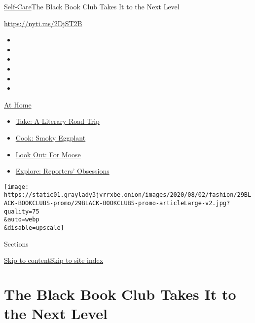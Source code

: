 \href{/section/style/self-care/}{Self-Care}\textbar{}The Black Book Club
Takes It to the Next Level

\url{https://nyti.ms/2DjST2B}

\begin{itemize}
\item
\item
\item
\item
\item
\item
\end{itemize}

\href{https://www.nytimes3xbfgragh.onion/spotlight/at-home?action=click\&pgtype=Article\&state=default\&region=TOP_BANNER\&context=at_home_menu}{At
Home}

\begin{itemize}
\tightlist
\item
  \href{https://www.nytimes3xbfgragh.onion/2020/07/28/books/time-for-a-literary-road-trip.html?action=click\&pgtype=Article\&state=default\&region=TOP_BANNER\&context=at_home_menu}{Take:
  A Literary Road Trip}
\item
  \href{https://www.nytimes3xbfgragh.onion/2020/07/29/magazine/bored-with-your-home-cooking-some-smoky-eggplant-will-fix-that.html?action=click\&pgtype=Article\&state=default\&region=TOP_BANNER\&context=at_home_menu}{Cook:
  Smoky Eggplant}
\item
  \href{https://www.nytimes3xbfgragh.onion/2020/07/27/travel/moose-michigan-isle-royale.html?action=click\&pgtype=Article\&state=default\&region=TOP_BANNER\&context=at_home_menu}{Look
  Out: For Moose}
\item
  \href{https://www.nytimes3xbfgragh.onion/interactive/2020/at-home/even-more-reporters-editors-diaries-lists-recommendations.html?action=click\&pgtype=Article\&state=default\&region=TOP_BANNER\&context=at_home_menu}{Explore:
  Reporters' Obsessions}
\end{itemize}

\texttt{[image: https://static01.graylady3jvrrxbe.onion/images/2020/08/02/fashion/29BLACK-BOOKCLUBS-promo/29BLACK-BOOKCLUBS-promo-articleLarge-v2.jpg?quality=75\\\&auto=webp\\\&disable=upscale]}

Sections

\protect\hyperlink{site-content}{Skip to
content}\protect\hyperlink{site-index}{Skip to site index}

\hypertarget{the-black-book-club-takes-it-to-the-next-level}{%
\section{The Black Book Club Takes It to the Next
Level}\label{the-black-book-club-takes-it-to-the-next-level}}

